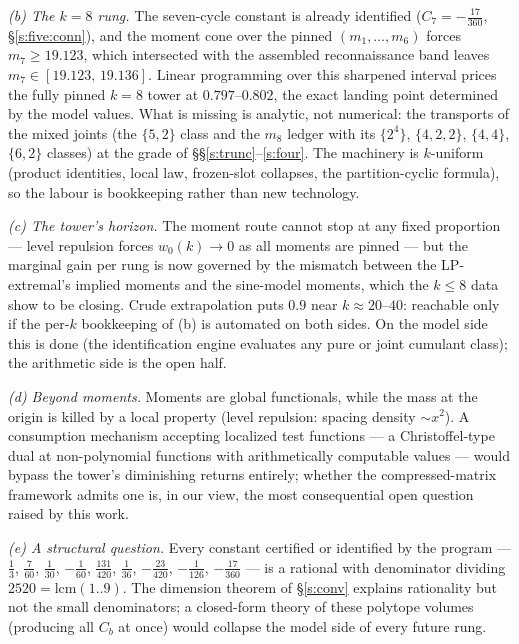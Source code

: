 \documentclass[11pt]{article}
\numberwithin{equation}{section}
\theoremstyle{definition}
\theoremstyle{remark}
\begin{document}
\emph{(b) The $k=8$ rung.} The seven-cycle constant is already
identified ($C_7=-\tfrac{17}{360}$, \S\ref{s:five:conn}), and
the moment cone over the pinned $(m_1,\dots,m_6)$ forces
$m_7\ge19.123$, which intersected with the assembled
reconnaissance band leaves $m_7\in[19.123,\,19.136]$. Linear
programming over this sharpened interval prices the fully
pinned $k=8$ tower at $0.797$--$0.802$, the exact landing
point determined by the model values. What is missing is
analytic, not numerical: the transports of the mixed joints
(the $\{5,2\}$ class and the $m_8$ ledger with its
$\{2^4\}$, $\{4,2,2\}$, $\{4,4\}$, $\{6,2\}$ classes)
at the grade of \S\S\ref{s:trunc}--\ref{s:four}. The
machinery is $k$-uniform (product identities, local law,
frozen-slot collapses, the partition-cyclic formula), so the
labour is bookkeeping rather than new technology.

\emph{(c) The tower's horizon.} The moment route cannot stop
at any fixed proportion --- level repulsion forces
$w_0(k)\to0$ as all moments are pinned --- but the marginal
gain per rung is now governed by the mismatch between the
LP-extremal's implied moments and the sine-model moments,
which the $k\le8$ data show to be closing. Crude
extrapolation puts $0.9$ near $k\approx20$--$40$: reachable
only if the per-$k$ bookkeeping of (b) is automated on both
sides. On the model side this is done (the identification
engine evaluates any pure or joint cumulant class); the
arithmetic side is the open half.

\emph{(d) Beyond moments.} Moments are global functionals,
while the mass at the origin is killed by a local property
(level repulsion: spacing density $\sim x^{2}$). A
consumption mechanism accepting localized test functions ---
a Christoffel-type dual at non-polynomial functions with
arithmetically computable values --- would bypass the tower's
diminishing returns entirely; whether the compressed-matrix
framework admits one is, in our view, the most consequential
open question raised by this work.

\emph{(e) A structural question.} Every constant certified or
identified by the program --- $\tfrac13$, $\tfrac7{60}$, $\tfrac1{30}$,
$-\tfrac1{60}$, $\tfrac{131}{420}$, $\tfrac1{36}$,
$-\tfrac{23}{420}$, $-\tfrac1{126}$, $-\tfrac{17}{360}$ ---
is a rational with denominator dividing
$2520=\mathrm{lcm}(1..9)$. The dimension theorem of
\S\ref{s:conv} explains rationality but not the small
denominators; a closed-form theory of these polytope volumes
(producing all $C_b$ at once) would collapse the model side of
every future rung.
\end{document}
